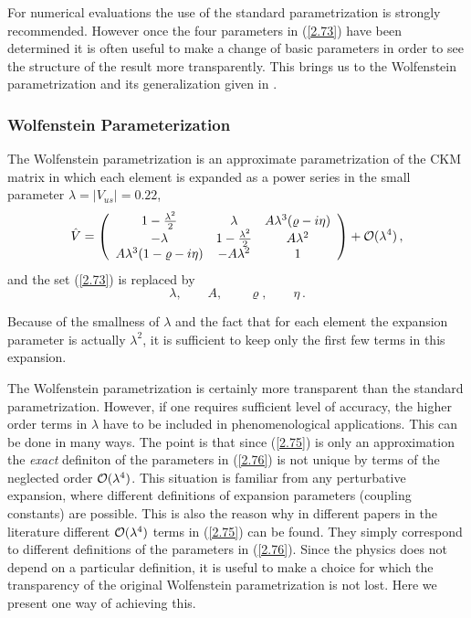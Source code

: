 \documentclass[12pt]{article}
\newcommand{\ord}{{\cal O}}
\begin{document}
\begin{itemize}
For numerical evaluations the use of the standard parametrization
is strongly recommended. However once the four parameters in
(\ref{2.73}) have been determined it is often useful to make
a change of basic parameters in order to see the structure of
the result more transparently. This brings us to the Wolfenstein
parametrization \cite{WO} and its generalization given in 
\cite{BLO}.

\subsubsection{Wolfenstein Parameterization }\label{Wolf-Par}
 The Wolfenstein parametrization 
is an approximate parametrization of the CKM matrix in which
each element is expanded as a power series in the small parameter
$\lambda=| V_{us}|=0.22$,
\begin{equation}\label{2.75} 
\hat V=
\left(\begin{array}{ccc}
1-{\lambda^2\over 2}&\lambda&A\lambda^3(\varrho-i\eta)\\ -\lambda&
1-{\lambda^2\over 2}&A\lambda^2\\ A\lambda^3(1-\varrho-i\eta)&-A\lambda^2&
1\end{array}\right)
+\ord(\lambda^4)\,,
\end{equation}
and the set (\ref{2.73}) is replaced by
\begin{equation}\label{2.76}
\lambda, \qquad A, \qquad \varrho, \qquad \eta \, .
\end{equation}

Because of the
smallness of $\lambda$ and the fact that for each element 
the expansion parameter is actually
$\lambda^2$, it is sufficient to keep only the first few terms
in this expansion. 

The Wolfenstein parametrization is certainly more transparent than
the standard parametrization. However, if one requires sufficient 
level of accuracy, the higher order terms in $\lambda$ have to
be included in phenomenological applications.
This can be done in many ways.
The
point is that since (\ref{2.75}) is only an approximation the {\em exact}
definiton of the parameters in (\ref{2.76}) is not unique by terms of the 
neglected order
${\cal O}(\lambda^4)$. 
This situation is familiar from any perturbative expansion, where
different definitions of expansion parameters (coupling constants) 
are possible.
This is also the reason why in different papers in the
literature different ${\cal O}(\lambda^4)$ terms in (\ref{2.75})
 can be found. They simply
correspond to different definitions of the parameters in (\ref{2.76}).
Since the physics does not depend on a particular definition, it
is useful to make a choice for which the transparency of the original
Wolfenstein parametrization is not lost. Here we present one
way of achieving this.


\end{itemize}
\end{document}

